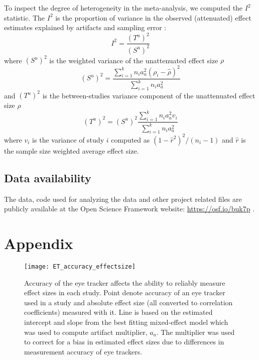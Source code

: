 \documentclass{article}
\begin{document}
To inspect the degree of heterogeneity in the meta-analysis, we computed the $I^2$ statistic. The $I^2$ is the proportion of variance in the observed (attenuated) effect estimates explained by artifacts and sampling error \citep{borenstein2011introduction}: 
%
\begin{equation}
\label{eq:i2_statistic}
I^2 = \frac{(T^u)^2}{(S^u)^2}
\end{equation}
%
where $(S^u)^2$ is the weighted variance of the unattenuated effect size $\rho$
%
\begin{equation}
\label{eq:Su2_var}
(S^u)^2 = \frac{\sum_{i=1}^k n_i a_a^2 (\rho_i - \hat{\rho})^2}{\sum_{i=1}^k n_i a_a^2}
\end{equation}
%
and $(T^u)^2$ is the between-studies variance component of the unattenuated effect size $\rho$
%
\begin{equation}
\label{eq:Tu2_var}
(T^u)^2 = (S^u)^2 \frac{\sum_{i=1}^k n_i a_a^2 v_i}{\sum_{i=1}^k n_i a_a^2}
\end{equation}
%
where $v_i$ is the variance of study $i$ computed as $(1 - \hat{r}^2)^2 / (n_i - 1)$ and $\hat{r}$ is the sample size weighted average effect size.


\subsection{Data availability}

The data, code used for analyzing the data and other project related files are publicly available at the Open Science Framework website: \url{https://osf.io/buk7p} \citep{osfrepo}.









\FloatBarrier
\section{Appendix}
\label{appendix}


\begin{figure}
\texttt{[image: ET\_accuracy\_effectsize]}
\centering
\caption{Accuracy of the eye tracker affects the ability to reliably measure effect sizes in each study. Point denote accuracy of an eye tracker used in a study and absolute effect size (all converted to correlation coefficients) measured with it. Line is based on the estimated intercept and slope from the best fitting mixed-effect model which was used to compute artifact multiplier, $a_a$. The multiplier was used to correct for a bias in estimated effect sizes due to differences in measurement accuracy of eye trackers.}
\label{fig:ET_accuracy_effectsize}
\end{figure}
\clearpage
\end{document}
